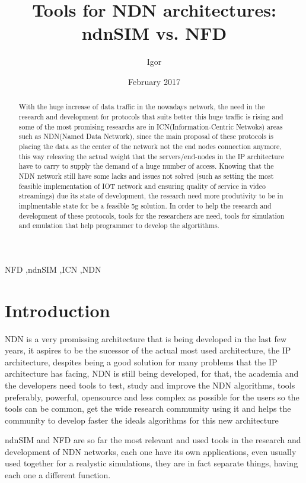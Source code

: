 \documentclass[preprint,12pt]{elsarticle}
\begin{document}
\begin{frontmatter}

\title{Tools for NDN architectures: ndnSIM vs. NFD}
\author{Igor}
\date{February 2017}
\address{Belem, Brazil}
\begin{abstract}
With the huge increase of data traffic in the nowadays network, the need in the research and development for protocols that suits better this huge traffic is rising and some of the most promising researchs are in ICN(Information-Centric Netwoks) areas such as NDN(Named Data Network), since the main proposal of these protocols is placing the data as the center of the network not the end nodes connection anymore, this way releaving the actual weight that the servers/end-nodes in the IP architecture have to carry to supply the demand of a huge number of access. Knowing that the NDN network still have some lacks and issues not solved (such as setting the most feasible implementation of IOT network and ensuring quality of service in video streamings) due its state of development, the research need more produtivity to be in implmentable state for be a feasible 5g solution. In order to help the research and development of these protocols, tools for the researchers are need, tools for simulation and emulation that help programmer to develop the algortithms.

\end{abstract}

\begin{keyword}
NFD \sep ndnSIM \sep ICN \sep NDN 


\end{keyword}
\end{frontmatter}
\section{Introduction}
\label{S:1}
NDN is a very promissing architecture that is being developed in the last few years, it aspires to be the sucessor of the actual most used architecture, the IP architecture, despites being a good solution for many problems that the IP architecture has facing, NDN is still being developed, for that, the academia and the developers need tools to test, study and improve the NDN algorithms, tools preferably, powerful, opensource and less complex as possible for the users so the tools can be common, get the wide research commumity using it and helps the community to develop faster the ideals algorithms for this new architecture \par
ndnSIM and NFD are so far the most relevant and used tools in the research and development of NDN networks, each one have its own applications, even usually used together for a realystic simulations, they are in fact separate things, having each one a different function.
\end{document}
